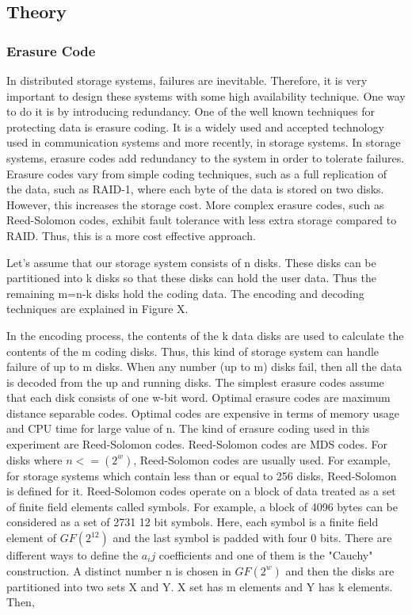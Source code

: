 \documentclass[conference]{IEEEtran}
\begin{document}
\subsection{Theory}
\subsubsection{Erasure Code}
In distributed storage systems, failures are inevitable. Therefore, it is very
important to design these systems with some high availability technique. One way
to do it is by introducing redundancy. One of the well known techniques for
protecting data is erasure coding. It is a widely used and accepted technology
used in communication systems and more recently, in storage systems. In storage
systems, erasure codes add redundancy to the system in order to tolerate
failures. Erasure codes vary from simple coding techniques, such as a full
replication of the data, such as RAID-1, where each byte of the data is stored
on two disks. However, this increases the storage cost. More complex erasure
codes, such as Reed-Solomon codes, exhibit fault tolerance with less extra
storage compared to RAID. Thus, this is a more cost effective approach.

Let's assume that our storage system consists of n disks. These disks can
be partitioned into k disks so that these disks can hold the user data. Thus
the remaining m=n-k disks hold the coding data. The encoding and decoding
techniques are explained in Figure X.

In the encoding process, the contents of the k data disks are used to
calculate the contents of the m coding disks. Thus, this kind of storage
system can handle failure of up to m disks. When any number (up to m) disks
fail, then all the data is decoded from the up and running disks. The
simplest erasure codes assume that each disk consists of one w-bit word.
Optimal erasure codes are maximum distance separable codes. Optimal codes are
expensive in terms of memory usage and CPU time for large value of n. 
The kind of erasure coding used in this experiment are Reed-Solomon codes.
Reed-Solomon codes are MDS codes. For disks where $n<= (2^w)$, Reed-Solomon
codes are usually used. For example, for storage systems which contain
less than or equal to 256 disks, Reed-Solomon is defined for it.
Reed-Solomon codes operate on a block of data treated as a set of finite
field elements called symbols. For example, a block of 4096 bytes can be
considered as a set of 2731 12 bit symbols. Here, each symbol is a finite
field element of $GF(2^12)$ and the last symbol is padded with four 0 bits.
There are different ways to define the $a_ij$ coefficients and one of
them is the "Cauchy" construction. A distinct number n is chosen in $GF(2^w)$ and
then the disks are partitioned into two sets X and Y. X set has m elements
and Y has k elements. Then, 
\end{document}
